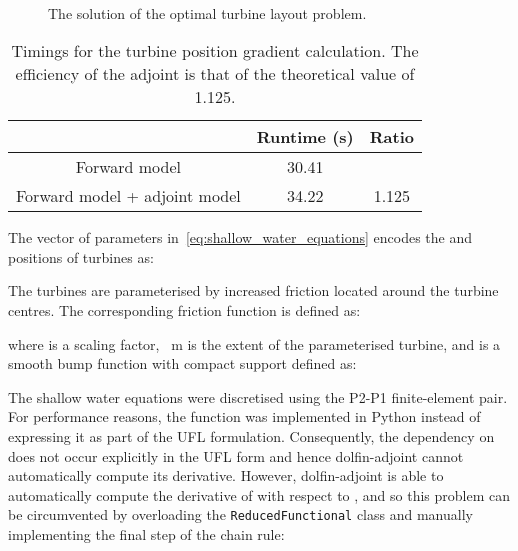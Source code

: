 \documentclass[prodmode,acmtoms]{acmsmall}
\newcommand{\da}{\mbox{{dolfin-adjoint}}\xspace}
\newcommand{\ptwopone}{\mbox{P2-P1}\xspace}
\begin{document}
\begin{figure}[t]
\centering
        \\
        \hspace{2cm}
        \caption{The solution of the optimal turbine layout problem.}\label{fig:turbine_optimisation}
\end{figure}
\begin{table}
\centering
\begin{tabular}{ccc}
\toprule
       & Runtime (s) & Ratio \\
\midrule
Forward model &  30.41  &     \\
Forward model + adjoint model & 34.22 & 1.125 \\
\bottomrule
\end{tabular}
\caption{Timings for the turbine position gradient calculation. The efficiency of the adjoint is that of the theoretical value of 1.125.}
\label{tab:turbine-timings}
\end{table}

The vector of parameters  in~\eqref{eq:shallow_water_equations} encodes the  and  positions of  turbines as:

The turbines are parameterised by increased friction located around the turbine centres.
The corresponding friction function  is defined as: 

where  is a scaling factor, ~m is the extent of the parameterised turbine, and  is a smooth bump function with compact support defined as:


The shallow water equations were discretised using the \ptwopone finite-element pair. 
For performance reasons, the function  was implemented in Python instead of expressing it as part of the UFL formulation.
Consequently, the dependency on  does not occur explicitly in the UFL form and hence \da cannot automatically compute its derivative.
However, \da is able to automatically compute the derivative of  with respect to , and so this problem can be circumvented by
overloading the \texttt{ReducedFunctional} class and manually implementing the final step of the chain rule:
\end{document}
